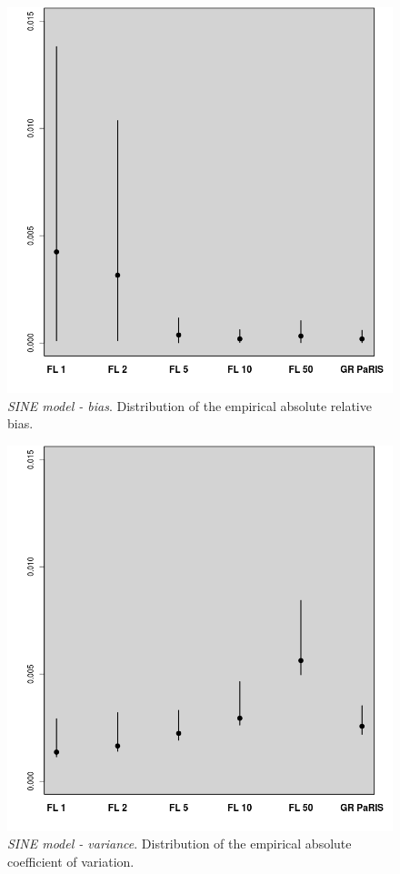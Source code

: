 \documentclass[12pt]{article}
\newcommand{\1}{\mathrm{1}}
\begin{document}
\begin{figure}[p]
\centering
\includegraphics[scale=0.5]{res_mult_SINE_bias}
\caption{{\em SINE model - bias}. Distribution of the empirical absolute relative bias.}
\label{fig:mult:SINE:b}
\end{figure}

\begin{figure}[p]
\centering
\includegraphics[scale=0.5]{res_mult_SINE_cv}
\caption{{\em SINE model - variance}. Distribution of the empirical absolute coefficient of variation.}
\label{fig:mult:SINE:cv}
\end{figure}
\end{document}
